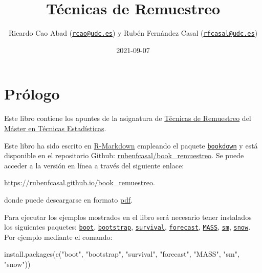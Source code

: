 \documentclass[
]{book}
\title{Técnicas de Remuestreo}
\author{Ricardo Cao Abad (\href{mailto:rcao@udc.es}{\nolinkurl{rcao@udc.es}}) y Rubén Fernández Casal (\href{mailto:rfcasal@udc.es}{\nolinkurl{rfcasal@udc.es}})}
\date{2021-09-07}
\newenvironment{Shaded}{\begin{snugshade}}{\end{snugshade}}
\newcommand{\FunctionTok}[1]{\textcolor[rgb]{0.00,0.00,0.00}{#1}}
\newcommand{\NormalTok}[1]{#1}
\newcommand{\StringTok}[1]{\textcolor[rgb]{0.31,0.60,0.02}{#1}}
\theoremstyle{break}
\theoremstyle{definition}
\theoremstyle{definition}
\theoremstyle{definition}
\theoremstyle{definition}
\theoremstyle{remark}
\begin{document}
\maketitle

{
\setcounter{tocdepth}{1}
\tableofcontents
}
\hypertarget{pruxf3logo}{%
\chapter*{Prólogo}\label{pruxf3logo}}

Este libro contiene los apuntes de la asignatura de \href{http://eamo.usc.es/pub/mte/index.php/es/?option=com_content\&view=article\&id=2202\&idm=22\&a\%C3\%B1o=2019}{Técnicas de Remuestreo} del \href{http://eio.usc.es/pub/mte}{Máster en Técnicas Estadísticas}.

Este libro ha sido escrito en \href{http://rmarkdown.rstudio.com}{R-Markdown} empleando el paquete \href{https://bookdown.org/yihui/bookdown/}{\texttt{bookdown}} y está disponible en el repositorio Github: \href{https://github.com/rubenfcasal/book_remuestreo}{rubenfcasal/book\_remuestreo}.
Se puede acceder a la versión en línea a través del siguiente enlace:

\url{https://rubenfcasal.github.io/book_remuestreo}.

donde puede descargarse en formato \href{https://rubenfcasal.github.io/book_remuestreo/book_remuestreo.pdf}{pdf}.

Para ejecutar los ejemplos mostrados en el libro será necesario tener instalados los siguientes paquetes:
\href{https://CRAN.R-project.org/package=boot}{\texttt{boot}}, \href{https://CRAN.R-project.org/package=bootstrap}{\texttt{bootstrap}}, \href{https://CRAN.R-project.org/package=survival}{\texttt{survival}}, \href{https://CRAN.R-project.org/package=forecast}{\texttt{forecast}}, \href{https://CRAN.R-project.org/package=MASS}{\texttt{MASS}}, \href{https://CRAN.R-project.org/package=sm}{\texttt{sm}}, \href{https://CRAN.R-project.org/package=snow}{\texttt{snow}}.
Por ejemplo mediante el comando:

\begin{Shaded}
\begin{Highlighting}[]
\FunctionTok{install.packages}\NormalTok{(}\FunctionTok{c}\NormalTok{(}\StringTok{"boot"}\NormalTok{, }\StringTok{"bootstrap"}\NormalTok{, }\StringTok{"survival"}\NormalTok{, }\StringTok{"forecast"}\NormalTok{, }\StringTok{"MASS"}\NormalTok{, }\StringTok{"sm"}\NormalTok{, }\StringTok{"snow"}\NormalTok{))}
\end{Highlighting}
\end{Shaded}
\end{document}
